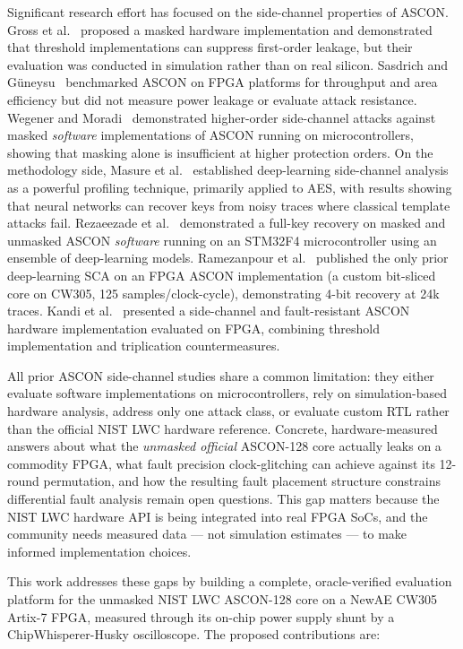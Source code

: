 \documentclass[conference]{IEEEtran}
\begin{document}
Significant research effort has focused on the side-channel
properties of ASCON. Gross et al.~\cite{gross2015ascon}
proposed a masked hardware implementation and demonstrated that
threshold implementations can suppress first-order leakage, but
their evaluation was conducted in simulation rather than on real
silicon. Sasdrich and G\"{u}neysu~\cite{sasdrich2015ascon}
benchmarked ASCON on FPGA platforms for throughput and area
efficiency but did not measure power leakage or evaluate attack
resistance. Wegener and Moradi~\cite{wegener2024ascon}
demonstrated higher-order side-channel attacks against masked
\emph{software} implementations of ASCON running on
microcontrollers, showing that masking alone is insufficient at
higher protection orders. On the methodology side, Masure et
al.~\cite{masure2020dlsca} established deep-learning
side-channel analysis as a powerful profiling technique,
primarily applied to AES, with results showing that neural
networks can recover keys from noisy traces where classical
template attacks fail. Rezaeezade et al.~\cite{rezaeezade2024ascon}
demonstrated a full-key recovery on masked and unmasked ASCON
\emph{software} running on an STM32F4 microcontroller using an
ensemble of deep-learning models. Ramezanpour et
al.~\cite{ramezanpour2020scar} published the only prior
deep-learning SCA on an FPGA ASCON implementation (a custom
bit-sliced core on CW305, 125 samples/clock-cycle), demonstrating
4-bit recovery at 24k traces. Kandi et al.~\cite{kandi2024ascon}
presented a side-channel and fault-resistant ASCON hardware
implementation evaluated on FPGA, combining threshold
implementation and triplication countermeasures.

All prior ASCON side-channel studies share a common
limitation: they either evaluate software implementations on
microcontrollers, rely on simulation-based hardware analysis,
address only one attack class, or evaluate custom RTL rather
than the official NIST LWC hardware reference. Concrete,
hardware-measured answers about what the \emph{unmasked official}
ASCON-128 core actually leaks on a commodity FPGA, what fault
precision clock-glitching can achieve against its 12-round
permutation, and how the resulting fault placement structure
constrains differential fault analysis remain open questions.
This gap matters because the NIST LWC hardware API
is being integrated into real FPGA SoCs, and the community
needs measured data — not simulation estimates — to make
informed implementation choices.

This work addresses these gaps by building a complete,
oracle-verified evaluation platform for the unmasked NIST LWC
ASCON-128 core on a NewAE CW305 Artix-7 FPGA, measured through
its on-chip power supply shunt by a ChipWhisperer-Husky
oscilloscope. The proposed contributions are:
\end{document}
